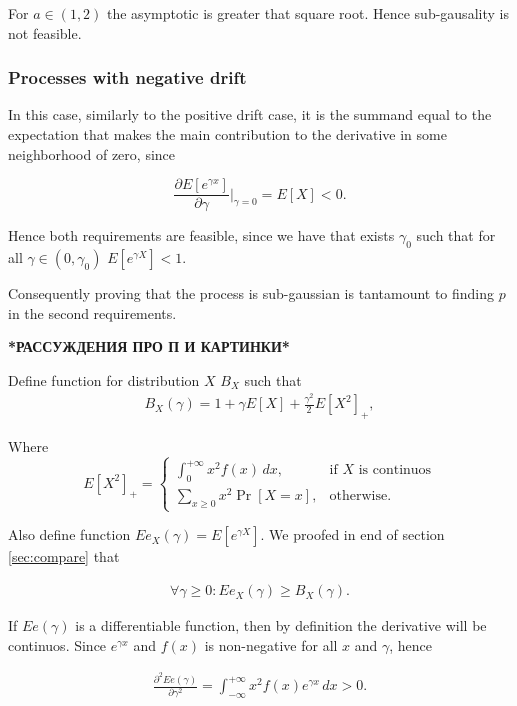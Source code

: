 \documentclass[12pt, a4paper]{article}
\theoremstyle{remark}
\theoremstyle{definition}
\newcommand{\infint}[1]{\int_{-\infty}^{+\infty} #1 \, dx}
\begin{document}
For $a \in (1, 2)$ the asymptotic is greater that square root. Hence sub-gausality is not feasible.

\subsubsection{Processes with negative drift}

In this case, similarly to the positive drift case, it is the summand equal to the expectation that makes the main contribution to the derivative in some neighborhood of zero, since

$$\frac{\partial E[e^{\gamma x}]}{\partial \gamma} \Big|_{\gamma = 0} = E[X] < 0.$$

Hence both requirements are feasible, since we have that exists \(\gamma_0\) such that for all \(\gamma \in (0, \gamma_0)\) $E[e^{\gamma X}] < 1.$

Consequently proving that the process is sub-gaussian is tantamount to finding $p$ in the second requirements.

\hfill

\textbf{*РАССУЖДЕНИЯ ПРО П И КАРТИНКИ*}

\hfill

Define function for distribution $X$ $B_X$ such that
\begin{align*}
    B_X(\gamma) = 1 + \gamma E[X] + \frac{\gamma^2}{2} E[X^2]_+,
\end{align*}

Where
\[
E[X^2]_+= 
\begin{cases}
    \int_0^{+\infty} x^2 f(x)\, dx,& \text{if $X$ is continuos}\\
    \sum_{x \geq 0} x^2 \Pr[X = x],              & \text{otherwise}.
\end{cases}
\]

Also define function $Ee_X(\gamma) = E[e^{\gamma X}]$. We proofed in end of section \ref*{sec:compare} that

\begin{align*}
    \forall \gamma\geq 0: Ee_X(\gamma) \geq B_X(\gamma).
\end{align*}

If $Ee(\gamma)$ is a differentiable function, then by definition the derivative will be continuos. Since $e^{\gamma x}$ and $f(x)$ is non-negative for all $x$ and $\gamma$, hence

\begin{align*}
    \frac{\partial^2 Ee(\gamma)}{\partial\gamma^2} = \infint{x^2 f(x) e^{\gamma x}} > 0.
\end{align*}
\end{document}
